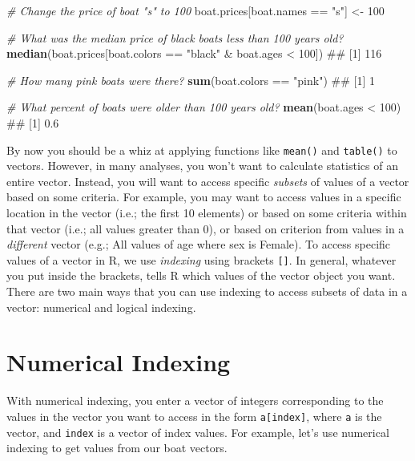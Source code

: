 \documentclass[]{book}
\newenvironment{Shaded}{\begin{snugshade}}{\end{snugshade}}
\newcommand{\KeywordTok}[1]{\textcolor[rgb]{0.13,0.29,0.53}{\textbf{{#1}}}}
\newcommand{\DecValTok}[1]{\textcolor[rgb]{0.00,0.00,0.81}{{#1}}}
\newcommand{\StringTok}[1]{\textcolor[rgb]{0.31,0.60,0.02}{{#1}}}
\newcommand{\CommentTok}[1]{\textcolor[rgb]{0.56,0.35,0.01}{\textit{{#1}}}}
\newcommand{\NormalTok}[1]{{#1}}
\theoremstyle{definition}
\theoremstyle{definition}
\theoremstyle{remark}
\begin{document}
\begin{Shaded}
\begin{Highlighting}[]
\CommentTok{# Change the price of boat "s" to 100}
\NormalTok{boat.prices[boat.names ==}\StringTok{ "s"}\NormalTok{] <-}\StringTok{ }\DecValTok{100}

\CommentTok{# What was the median price of black boats less than 100 years old?}
\KeywordTok{median}\NormalTok{(boat.prices[boat.colors ==}\StringTok{ "black"} \NormalTok{&}\StringTok{ }\NormalTok{boat.ages <}\StringTok{ }\DecValTok{100}\NormalTok{])}
\NormalTok{## [1] 116}

\CommentTok{# How many pink boats were there?}
\KeywordTok{sum}\NormalTok{(boat.colors ==}\StringTok{ "pink"}\NormalTok{)}
\NormalTok{## [1] 1}

\CommentTok{# What percent of boats were older than 100 years old?}
\KeywordTok{mean}\NormalTok{(boat.ages <}\StringTok{ }\DecValTok{100}\NormalTok{)}
\NormalTok{## [1] 0.6}
\end{Highlighting}
\end{Shaded}

By now you should be a whiz at applying functions like \texttt{mean()}
and \texttt{table()} to vectors. However, in many analyses, you won't
want to calculate statistics of an entire vector. Instead, you will want
to access specific \emph{subsets} of values of a vector based on some
criteria. For example, you may want to access values in a specific
location in the vector (i.e.; the first 10 elements) or based on some
criteria within that vector (i.e.; all values greater than 0), or based
on criterion from values in a \emph{different} vector (e.g.; All values
of age where sex is Female). To access specific values of a vector in R,
we use \emph{indexing} using brackets \texttt{{[}{]}}. In general,
whatever you put inside the brackets, tells R which values of the vector
object you want. There are two main ways that you can use indexing to
access subsets of data in a vector: numerical and logical indexing.

\section{Numerical Indexing}\label{numerical-indexing}

With numerical indexing, you enter a vector of integers corresponding to
the values in the vector you want to access in the form
\texttt{a{[}index{]}}, where \texttt{a} is the vector, and
\texttt{index} is a vector of index values. For example, let's use
numerical indexing to get values from our boat vectors.
\end{document}
